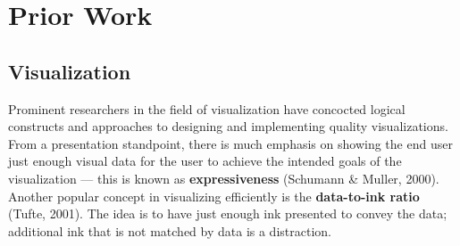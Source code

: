 \documentclass[12pt]{article}
\begin{document}
\fi


\vfill

\section{Prior Work}
\subsection{Visualization}
Prominent researchers in the field of visualization have concocted logical constructs and approaches to designing and implementing quality visualizations. From a presentation standpoint, there is much emphasis on showing the end user just enough visual data for the user to achieve the intended goals of the visualization --- this is known as \textbf{expressiveness} (Schumann \& Muller, 2000). Another popular concept in visualizing efficiently is the \textbf{data-to-ink ratio} (Tufte, 2001). The idea is to have just enough ink presented to convey the data; additional ink that is not matched by data is a distraction. 
\end{document}
